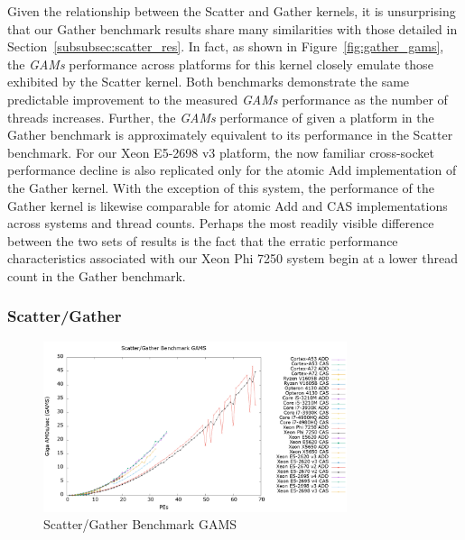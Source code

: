 Given the relationship between the Scatter and Gather kernels, it is unsurprising that our Gather benchmark results share many similarities with those detailed in Section~\ref{subsubsec:scatter_res}.
In fact, as shown in Figure~\ref{fig:gather_gams}, the \textit{GAMs} performance across platforms for this kernel closely emulate those exhibited by the Scatter kernel.
Both benchmarks demonstrate the same predictable improvement to the measured \textit{GAMs} performance as the number of threads increases.
Further, the \textit{GAMs} performance of given a platform in the Gather benchmark is approximately equivalent to its performance in the Scatter benchmark.
For our Xeon E5-2698 v3 platform, the now familiar cross-socket performance decline is also replicated only for the atomic Add implementation of the Gather kernel.
With the exception of this system, the performance of the Gather kernel is likewise comparable for atomic Add and CAS implementations across systems and thread counts. 
Perhaps the most readily visible difference between the two sets of results is the fact that the erratic performance characteristics associated with our Xeon Phi 7250 system begin at a lower thread count in the Gather benchmark.

\subsubsection{Scatter/Gather}
\label{subsubsec:sg_res}

\begin{figure}[!t]
\centering
\includegraphics[width=3.5in]{figures/SG_GAMS.png}
\caption{Scatter/Gather Benchmark GAMS}
\label{fig:sg_gams}
\end{figure}

